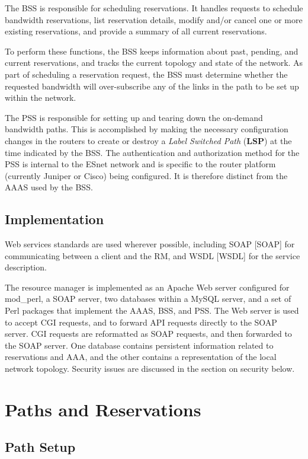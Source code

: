 \documentclass[conference]{IEEEtran}
\begin{document}
The BSS is responsible for scheduling reservations.  It handles
requests to schedule bandwidth reservations, list reservation details,
modify and/or cancel one or more existing reservations, and provide a summary
of all current reservations.

To perform these functions, the BSS keeps information about past,
pending, and current reservations, and tracks the current topology and state of
the network.  As part of scheduling a reservation request, the BSS must
determine whether the requested bandwidth will over-subscribe any of the links
in the path to be set up within the network.

The PSS is responsible for setting up and tearing down the on-demand bandwidth 
paths. This is accomplished by making the necessary configuration changes in 
the routers to create or destroy a \emph{Label Switched Path }(\textbf{LSP}) at the time
indicated by the BSS. The authentication and authorization method for the PSS 
is internal to the ESnet network and is specific to the router platform 
(currently Juniper or Cisco) being configured.  It is therefore distinct from 
the AAAS used by the BSS.

\subsection{Implementation}

Web services standards are used wherever possible, including SOAP [SOAP]
for communicating between a client and the RM, and 
WSDL [WSDL] for the service
description. 
 
The resource manager is implemented as an Apache Web server configured for
mod\_perl, a SOAP server, two databases within a MySQL server, and a set of 
Perl packages that implement the AAAS, BSS, and PSS.  The Web server is
used to accept CGI requests, and to forward API requests directly to the SOAP 
server.  CGI requests are reformatted as SOAP requests, and then forwarded to 
the SOAP server.  One database contains persistent information related to
reservations and AAA, and the other contains a representation of the local
network topology.  Security issues are discussed in the section on security
below.

\section{Paths and Reservations}

\subsection{Path Setup}
\end{document}
